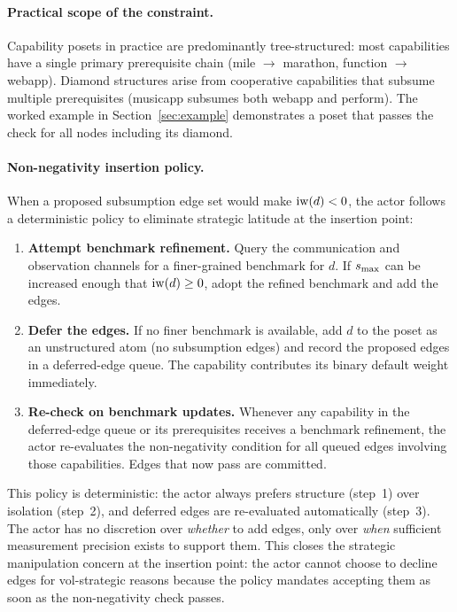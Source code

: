 \paragraph{Practical scope of the constraint.} Capability posets in practice
are predominantly tree-structured: most capabilities have a single primary
prerequisite chain (mile $\to$ marathon, function $\to$ webapp). Diamond
structures arise from cooperative capabilities that subsume multiple
prerequisites (musicapp subsumes both webapp and perform). The worked example
in Section~\ref{sec:example} demonstrates a poset that passes the check for
all nodes including its diamond.

\paragraph{Non-negativity insertion policy.} When a proposed subsumption edge
set would make $\operatorname{iw}(d) < 0$, the actor follows a deterministic policy to
eliminate strategic latitude at the insertion point:

\begin{enumerate}
\item \textbf{Attempt benchmark refinement.} Query the communication and
  observation channels for a finer-grained benchmark for $d$. If $s_{\mathrm{max}}$ can
  be increased enough that $\operatorname{iw}(d) \geq 0$, adopt the refined benchmark and
  add the edges.
\item \textbf{Defer the edges.} If no finer benchmark is available, add $d$ to
  the poset as an unstructured atom (no subsumption edges) and record the
  proposed edges in a deferred-edge queue. The capability contributes its
  binary default weight immediately.
\item \textbf{Re-check on benchmark updates.} Whenever any capability in the
  deferred-edge queue or its prerequisites receives a benchmark refinement, the
  actor re-evaluates the non-negativity condition for all queued edges
  involving those capabilities. Edges that now pass are committed.
\end{enumerate}

This policy is deterministic: the actor always prefers structure (step~1) over
isolation (step~2), and deferred edges are re-evaluated automatically (step~3).
The actor has no discretion over \emph{whether} to add edges, only over
\emph{when} sufficient measurement precision exists to support them. This
closes the strategic manipulation concern at the insertion point: the actor
cannot choose to decline edges for vol-strategic reasons because the policy
mandates accepting them as soon as the non-negativity check passes.

